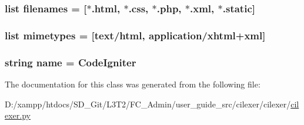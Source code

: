\subsubsection[{filenames}]{\setlength{\rightskip}{0pt plus 5cm}list filenames = \mbox{[}\textquotesingle{}$\ast$.html\textquotesingle{}, \textquotesingle{}$\ast$.css\textquotesingle{}, \textquotesingle{}$\ast$.php\textquotesingle{}, \textquotesingle{}$\ast$.xml\textquotesingle{}, \textquotesingle{}$\ast$.static\textquotesingle{}\mbox{]}\hspace{0.3cm}{\ttfamily [static]}}\label{classcilexer_1_1cilexer_1_1_code_igniter_lexer_ad63fcc40a3fb08841c9f0b5cee5741ee}
\hypertarget{classcilexer_1_1cilexer_1_1_code_igniter_lexer_a580daf9337ffa2ec48c5c36585da00ed}{}
\subsubsection[{mimetypes}]{\setlength{\rightskip}{0pt plus 5cm}list mimetypes = \mbox{[}\textquotesingle{}text/html\textquotesingle{}, \textquotesingle{}application/xhtml+xml\textquotesingle{}\mbox{]}\hspace{0.3cm}{\ttfamily [static]}}\label{classcilexer_1_1cilexer_1_1_code_igniter_lexer_a580daf9337ffa2ec48c5c36585da00ed}
\hypertarget{classcilexer_1_1cilexer_1_1_code_igniter_lexer_a8ccf841cb59e451791bcb2e1ac4f1edc}{}
\subsubsection[{name}]{\setlength{\rightskip}{0pt plus 5cm}string name = \textquotesingle{}Code\+Igniter\textquotesingle{}\hspace{0.3cm}{\ttfamily [static]}}\label{classcilexer_1_1cilexer_1_1_code_igniter_lexer_a8ccf841cb59e451791bcb2e1ac4f1edc}


The documentation for this class was generated from the following file\+:\begin{DoxyCompactItemize}
\item 
D\+:/xampp/htdocs/\+S\+D\+\_\+\+Git/\+L3\+T2/\+F\+C\+\_\+\+Admin/user\+\_\+guide\+\_\+src/cilexer/cilexer/\hyperlink{cilexer_8py}{cilexer.\+py}\end{DoxyCompactItemize}
